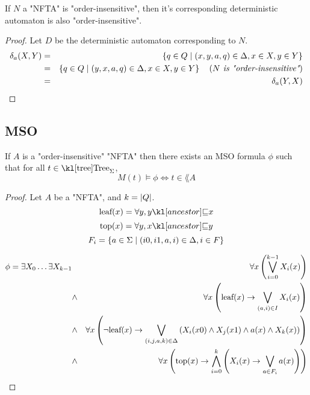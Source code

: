 \documentclass{article}
\begin{document}
\begin{lemma}
	If $N$ a "NFTA" is "order-insensitive", then it's corresponding deterministic automaton is also "order-insensitive".
\end{lemma}

\begin{proof}
	Let $D$ be the deterministic automaton corresponding to $N$.
	\begin{eqnarray*}
		\delta_a (X,Y) &=& \left\{q \in Q \mid (x,y,a,q) \in \Delta, x \in X, y \in Y\right\} \\
		&=& \left\{q \in Q \mid (y,x,a,q) \in \Delta, x \in X, y \in Y\right\}  \quad\left(\textit{$N$ is "order-insensitive"}\right) \\
		&=& \delta_a (Y,X)
	\end{eqnarray*}
\end{proof}

\subsection{MSO}

\begin{lemma}
	If $A$ is a "order-insensitive" "NFTA"  then there exists an MSO formula $\phi$ such that for all $t \in \tree_{\Sigma}$,
	\[ M(t) \models \phi \iff t \in \lang A \]
\end{lemma}

\begin{proof}
	Let $A$ be a "NFTA", and $k = \left|Q\right|$.
	\[\text{leaf} (x) = \forall y, \ancestor y x \]
	\[\text{top} (x) = \forall y, \ancestor x y \]
	\[F_i = \left\{a \in \Sigma \mid (i0,i1,a,i) \in \Delta, i \in F\right\}\]


	\begin{eqnarray*}
		\phi = \exists X_0 \ldots \exists X_{k-1} &\ & \forall x \left( \bigvee_{i=0}^{k-1} X_i(x) \right) \\
		&\land& \forall x \left( \text{leaf} (x) \rightarrow \bigvee_{(a,i)\in I}  X_i(x)   \right) \\
		&\land& \forall x \left(\lnot \text{leaf}(x) \rightarrow \bigvee_{(i,j,a,k)\in \Delta}  \left(X_i(x0) \land X_j(x1) \land a(x) \land X_k(x)\right)\right) \\
		&\land& \forall x \left(\text{top}(x) \rightarrow \bigwedge_{i= 0}^k \left( X_i(x) \rightarrow \bigvee_{a \in F_i} a(x) \right)\right)
	\end{eqnarray*}


\end{proof}





\end{document}
